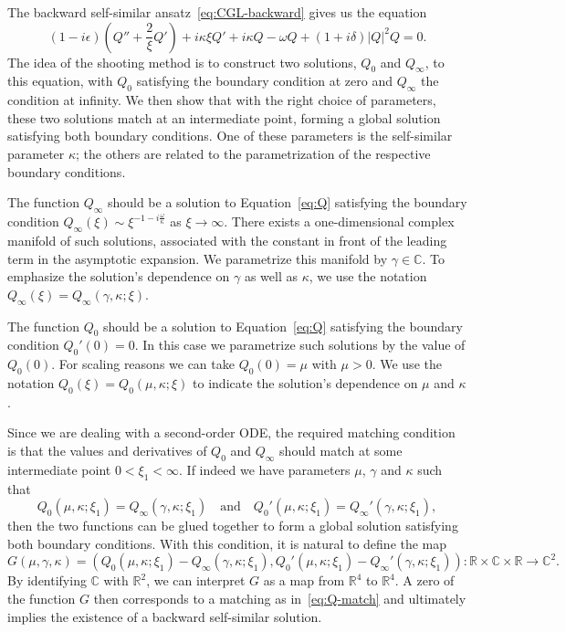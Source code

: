 \documentclass[11pt]{article}
\begin{document}
The backward self-similar ansatz~\eqref{eq:CGL-backward} gives us the
equation
\begin{equation}\label{eq:Q}
  (1 - i\epsilon)\left(Q'' + \frac{2}{\xi}Q'\right) + i\kappa\xi Q'
  + i \kappa Q - \omega Q + (1 + i\delta)|Q|^{2}Q = 0.
\end{equation}
The idea of the shooting method is to construct two solutions,
\(Q_{0}\) and \(Q_{\infty}\), to this equation, with \(Q_{0}\)
satisfying the boundary condition at zero and \(Q_{\infty}\) the
condition at infinity. We then show that with the right choice of
parameters, these two solutions match at an intermediate point,
forming a global solution satisfying both boundary conditions. One of
these parameters is the self-similar parameter \(\kappa\); the others
are related to the parametrization of the respective boundary
conditions.

The function \(Q_{\infty}\) should be a solution to
Equation~\eqref{eq:Q} satisfying the boundary condition
\(Q_{\infty}(\xi) \sim \xi^{-1 - i\frac{\omega}{\kappa}}\) as
\(\xi \to \infty\). There exists a one-dimensional complex manifold of
such solutions, associated with the constant in front of the leading
term in the asymptotic expansion.
We parametrize this manifold by \(\gamma \in \mathbb{C}\). To
emphasize the solution's dependence on \(\gamma\) as well as
\(\kappa\), we use the notation
\(Q_{\infty}(\xi) = Q_{\infty}(\gamma, \kappa; \xi)\).

The function \(Q_{0}\) should be a solution to Equation~\eqref{eq:Q}
satisfying the boundary condition \(Q_{0}'(0) = 0\). In this case we
parametrize such solutions by the value of \(Q_{0}(0)\). For scaling
reasons we can take \(Q_{0}(0) = \mu\) with \(\mu > 0\). We use the
notation \(Q_{0}(\xi) = Q_{0}(\mu, \kappa; \xi)\) to indicate the
solution's dependence on \(\mu\) and \(\kappa\).

Since we are dealing with a second-order ODE, the required matching
condition is that the values and derivatives of \(Q_{0}\) and
\(Q_{\infty}\) should match at some intermediate point
\(0 < \xi_{1} < \infty\). If indeed we have parameters \(\mu\),
\(\gamma\) and \(\kappa\) such that
\begin{equation}\label{eq:Q-match}
  Q_{0}(\mu, \kappa; \xi_{1}) = Q_{\infty}(\gamma, \kappa; \xi_{1})
  \quad\text{and}\quad
  Q_{0}'(\mu, \kappa; \xi_{1}) = Q_{\infty}'(\gamma, \kappa; \xi_{1}),
\end{equation}
then the two functions can be glued together to form a global solution
satisfying both boundary conditions. With this condition, it is
natural to define the map
\begin{equation}\label{eq:G}
  G(\mu, \gamma, \kappa) = \left(
    Q_{0}(\mu, \kappa; \xi_{1}) - Q_{\infty}(\gamma, \kappa; \xi_{1}),
    Q_{0}'(\mu, \kappa; \xi_{1}) - Q_{\infty}'(\gamma, \kappa; \xi_{1})
  \right) \colon \mathbb{R} \times \mathbb{C} \times \mathbb{R} \to \mathbb{C}^{2}.
\end{equation}
By identifying \(\mathbb{C}\) with \(\mathbb{R}^{2}\), we can
interpret \(G\) as a map from \(\mathbb{R}^{4}\) to
\(\mathbb{R}^{4}\). A zero of the function \(G\) then corresponds to a
matching as in~\eqref{eq:Q-match} and ultimately implies the
existence of a backward self-similar solution.
\end{document}

